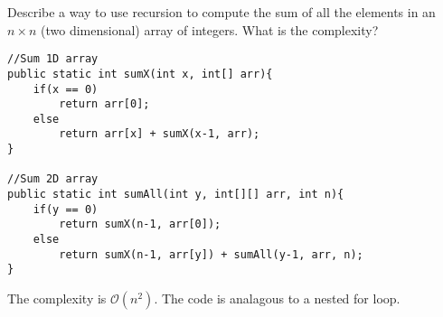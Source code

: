\item Describe a way to use recursion to compute the sum of all the elements in an $n\times n$ (two dimensional) array of integers. What is the complexity?\\[10pt]

\begin{lstlisting}
//Sum 1D array
public static int sumX(int x, int[] arr){
    if(x == 0)
        return arr[0];
    else
        return arr[x] + sumX(x-1, arr);
}

//Sum 2D array
public static int sumAll(int y, int[][] arr, int n){
    if(y == 0)
        return sumX(n-1, arr[0]);
    else
        return sumX(n-1, arr[y]) + sumAll(y-1, arr, n);
}
\end{lstlisting}

The complexity is $\mathcal{O}(n^2)$. The code is analagous to a nested for loop.